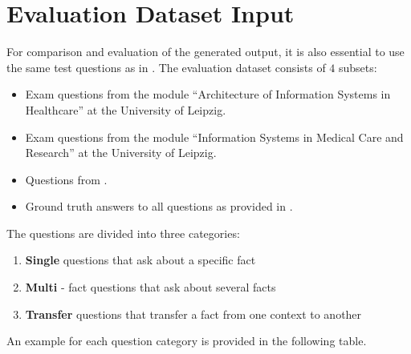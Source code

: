\section{Evaluation Dataset Input}\label{sec:approach:questions}
For comparison and evaluation of the generated output, it is also essential to use the same test questions as in \citet{Paul_Keller}.
%
The evaluation dataset consists of $4$ subsets:
\begin{itemize}
    \item Exam questions from the module \enquote{Architecture of Information Systems in Healthcare} at the University of Leipzig.
    \item Exam questions from the module \enquote{Information Systems in Medical Care and Research} at the University of Leipzig.
    \item Questions from \citet{bb2}.
    \item Ground truth answers to all questions as provided in \citet{Paul_Keller}.
\end{itemize}
%
The questions are divided into three categories:
\begin{enumerate}\label{def:question_type}
    \item \textbf{Single} questions that ask about a specific fact
    \item \textbf{Multi} - fact questions that ask about several facts
    \item \textbf{Transfer} questions that transfer a fact from one context to another
    \end{enumerate}
An example for each question category is provided in the following table.
